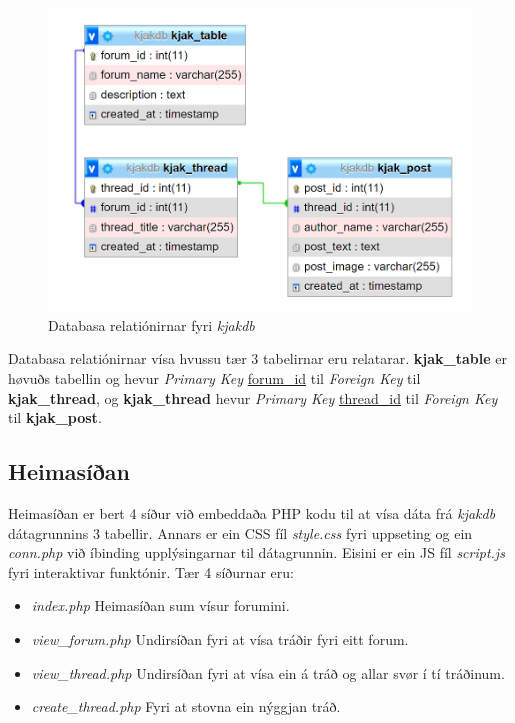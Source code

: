 \documentclass{article}
\begin{document}
\begin{figure}[H]
    \includegraphics[width=\linewidth]{kjakdb_table_relations.png}
    \caption{Databasa relatiónirnar fyri \textit{kjakdb}}
    \label{fig:kjakdb_table_relations}
\end{figure}

\par Databasa relatiónirnar vísa hvussu
tær 3 tabelirnar eru relatarar. \textbf{kjak\_table} er høvuðs tabellin og hevur
\textit{Primary Key} \underline{forum\_id} til \textit{Foreign Key} til \textbf{kjak\_thread},
og \textbf{kjak\_thread} hevur \textit{Primary Key} \underline{thread\_id} til \textit{Foreign Key}
til \textbf{kjak\_post}.

\subsection{Heimasíðan}
\par Heimasíðan er bert 4 síður við embeddaða PHP kodu til at vísa dáta frá \textit{kjakdb}
dátagrunnins 3 tabellir. Annars er ein CSS fíl \textit{style.css} fyri uppseting
og ein \textit{conn.php} við
íbinding upplýsingarnar til dátagrunnin. Eisini er ein JS fíl \textit{script.js}
fyri interaktivar funktónir.
Tær 4 síðurnar eru:
\begin{itemize}
    \item \textit{index.php} \- Heimasíðan sum vísur forumini.
    \item \textit{view\_forum.php} \- Undirsíðan fyri at vísa tráðir fyri eitt forum.
    \item \textit{view\_thread.php} \- Undirsíðan fyri at vísa ein á tráð og allar svør í tí
            tráðinum.
    \item \textit{create\_thread.php} \- Fyri at stovna ein nýggjan tráð.
\end{itemize}
\end{document}
